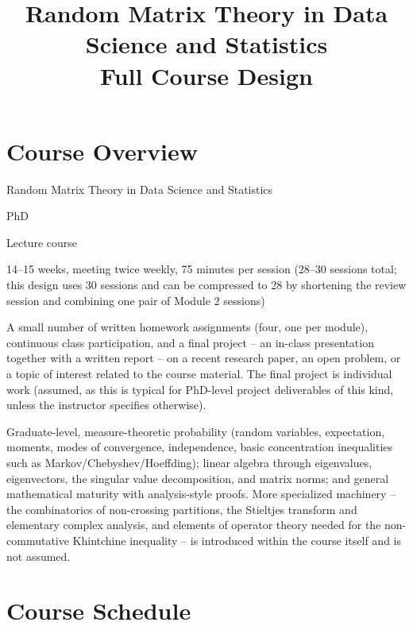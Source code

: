 \documentclass[11pt]{article}
\title{Random Matrix Theory in Data Science and Statistics\\[4pt]\large Full Course Design}
\author{}
\date{}
\begin{document}
\maketitle

\section{Course Overview}

\begin{description}[leftmargin=2.2cm,style=nextline]
\item[Course name] Random Matrix Theory in Data Science and Statistics
\item[Level] PhD
\item[Format] Lecture course
\item[Duration] 14--15 weeks, meeting twice weekly, 75 minutes per session (28--30 sessions total; this design uses 30 sessions and can be compressed to 28 by shortening the review session and combining one pair of Module 2 sessions)
\item[Assessment philosophy] A small number of written homework assignments (four, one per module), continuous class participation, and a final project -- an in-class presentation together with a written report -- on a recent research paper, an open problem, or a topic of interest related to the course material. The final project is individual work (assumed, as this is typical for PhD-level project deliverables of this kind, unless the instructor specifies otherwise).
\item[Assumed background] Graduate-level, measure-theoretic probability (random variables, expectation, moments, modes of convergence, independence, basic concentration inequalities such as Markov/Chebyshev/Hoeffding); linear algebra through eigenvalues, eigenvectors, the singular value decomposition, and matrix norms; and general mathematical maturity with analysis-style proofs. More specialized machinery -- the combinatorics of non-crossing partitions, the Stieltjes transform and elementary complex analysis, and elements of operator theory needed for the non-commutative Khintchine inequality -- is introduced within the course itself and is not assumed.
\end{description}

\section{Course Schedule}
\end{document}
